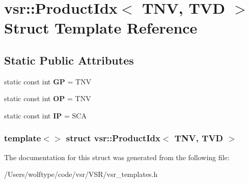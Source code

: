 \hypertarget{structvsr_1_1_product_idx_3_01_t_n_v_00_01_t_v_d_01_4}{\section{vsr\-:\-:Product\-Idx$<$ T\-N\-V, T\-V\-D $>$ Struct Template Reference}
\label{structvsr_1_1_product_idx_3_01_t_n_v_00_01_t_v_d_01_4}
}
\subsection*{Static Public Attributes}
\begin{DoxyCompactItemize}
\item 
\hypertarget{structvsr_1_1_product_idx_3_01_t_n_v_00_01_t_v_d_01_4_ac6870556b2da8893887ebaa9785d51c9}{static const int {\bfseries G\-P} = T\-N\-V}\label{structvsr_1_1_product_idx_3_01_t_n_v_00_01_t_v_d_01_4_ac6870556b2da8893887ebaa9785d51c9}

\item 
\hypertarget{structvsr_1_1_product_idx_3_01_t_n_v_00_01_t_v_d_01_4_a5bd8833c8005bd7957403a4ae56e7697}{static const int {\bfseries O\-P} = T\-N\-V}\label{structvsr_1_1_product_idx_3_01_t_n_v_00_01_t_v_d_01_4_a5bd8833c8005bd7957403a4ae56e7697}

\item 
\hypertarget{structvsr_1_1_product_idx_3_01_t_n_v_00_01_t_v_d_01_4_a4fddd8efe1a34582ef8498fa777ea1a3}{static const int {\bfseries I\-P} = S\-C\-A}\label{structvsr_1_1_product_idx_3_01_t_n_v_00_01_t_v_d_01_4_a4fddd8efe1a34582ef8498fa777ea1a3}

\end{DoxyCompactItemize}
\subsubsection*{template$<$$>$ struct vsr\-::\-Product\-Idx$<$ T\-N\-V, T\-V\-D $>$}



The documentation for this struct was generated from the following file\-:\begin{DoxyCompactItemize}
\item 
/\-Users/wolftype/code/vsr/\-V\-S\-R/vsr\-\_\-templates.\-h\end{DoxyCompactItemize}
